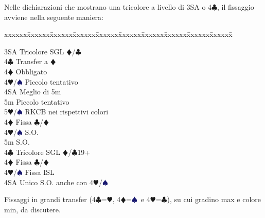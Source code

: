 \documentclass[a4paper,italian]{article}
\newcommand{\BC}{\textcolor{OliveGreen}{$\clubsuit$}}
\newcommand{\BD}{\textcolor{RedOrange}{$\vardiamondsuit$}}
\newcommand{\BH}{\textcolor{Red2}{$\varheartsuit${}}}
\newcommand{\BS}{\textcolor{MidnightBlue}{$\spadesuit${}}}
\newenvironment{bidtable}
{\begin{tabbing}

    xxxxxx\=xxxxxx\=xxxxxx\=xxxxxx\=xxxxxx\=xxxxxx\=xxxxxx\=xxxxxx\=xxxxxx\=xxxxxx\=\kill}
{\end{tabbing} }%
\newenvironment{varie}[1]
{\begin{tcolorbox}[colframe=green!40!black,title=#1]}
    {
\end{tcolorbox} }%
\begin{document}
                                Nelle dichiarazioni che mostrano una tricolore a livello di 3SA o 4\BC , il fissaggio avviene nella seguente maniera:
                                \bigbreak
                                \begin{bidtable}

                                    3SA \> Tricolore SGL \BD/\BC\+\\
                                    4\BC \> Transfer a \BD \+\\
                                    4\BD \> Obbligato\+\\
                                    4\BH/\BS \> Piccolo tentativo\\
                                    4SA \> Meglio di 5m\\
                                    5m \> Piccolo tentativo\\
                                    5\BH/\BS \> RKCB nei rispettivi colori\-\-\\
                                    4\BD \> Fissa \BC/\BD\\
                                    4\BH/\BS \> S.O.\\
                                    5m \> S.O.\-\\
                                    4\BC \> Tricolore SGL \BD/\BC 19+\+\\
                                    4\BD \> Fissa \BC/\BD\\
                                    4\BH/\BS \> Fissa ISL\\
                                    4SA \> Unico S.O. anche con 4\BH/\BS\-
                                \end{bidtable}
                                \bigbreak
                                \begin{varie}{Alternativa ai fissaggi}
                                    Fissaggi in grandi transfer (4\BC =\BH , 4\BD =\BS\ e 4\BH =\BC ), su cui gradino max e colore min, da discutere.
                                \end{varie}
                                \setcounter{secnumdepth}{4}
\end{document}
